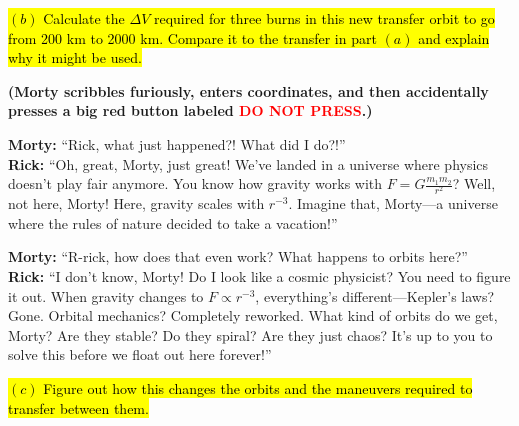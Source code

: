 \documentclass[a4paper, 12pt]{exam}
\begin{document}
\begin{center}
\end{center}

\hl{$(b)$ Calculate the $\Delta V$ required for three burns in this new transfer orbit to go from 200 km to 2000 km. Compare it to the transfer in part $(a)$ and explain why it might be used.}

\bigskip

\noindent \textbf{(Morty scribbles furiously, enters coordinates, and then accidentally presses a big red button labeled \textcolor{red}{DO NOT PRESS}.)}

\bigskip

\noindent \textbf{Morty:} “Rick, what just happened?! What did I do?!” \\

\noindent \textbf{Rick:} “Oh, great, Morty, just great! We’ve landed in a universe where physics doesn’t play fair anymore. You know how gravity works with $F = G \frac{m_1 m_2}{r^2}$? Well, not here, Morty! Here, gravity scales with $r^{-3}$. Imagine that, Morty—a universe where the rules of nature decided to take a vacation!”

\bigskip

\noindent \textbf{Morty:} “R-rick, how does that even work? What happens to orbits here?” \\

\noindent \textbf{Rick:} “I don’t know, Morty! Do I look like a cosmic physicist? You need to figure it out. When gravity changes to $F \propto r^{-3}$, everything’s different—Kepler’s laws? Gone. Orbital mechanics? Completely reworked. What kind of orbits do we get, Morty? Are they stable? Do they spiral? Are they just chaos? It’s up to you to solve this before we float out here forever!”

\bigskip

\hl{$(c)$ Figure out how this changes the orbits and the maneuvers required to transfer between them.}
\end{document}
